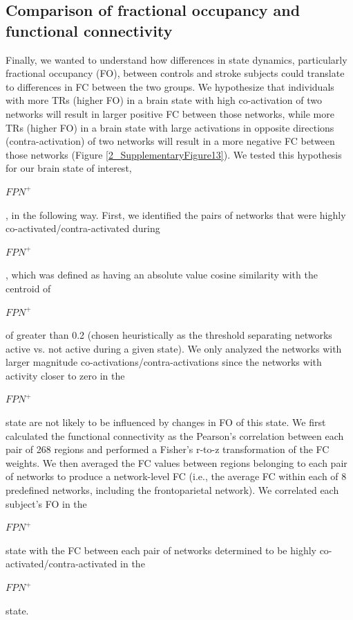 \documentclass[phd,tocprelim]{cornell}
\begin{document}
    \subsection{Comparison of fractional occupancy and functional connectivity}
    Finally, we wanted to understand how differences in state dynamics, particularly fractional occupancy (FO), between controls and stroke subjects could translate to differences in FC between the two groups. We hypothesize that individuals with more TRs (higher FO) in a brain state with high co-activation of two networks will result in larger positive FC between those networks, while more TRs (higher FO) in a brain state with large activations in opposite directions (contra-activation) of two networks will result in a more negative FC between those networks (Figure \ref{2_SupplementaryFigure13}). We tested this hypothesis for our brain state of interest,  \begin{Large}$FPN^+$\end{Large}, in the following way. First, we identified the pairs of networks that were highly co-activated/contra-activated during  \begin{Large}$FPN^+$\end{Large}, which was defined as having an absolute value cosine similarity with the centroid of  \begin{Large}$FPN^+$ \end{Large} of greater than 0.2 (chosen heuristically as the threshold separating networks active vs. not active during a given state). We only analyzed the networks with larger magnitude co-activations/contra-activations since the networks with activity closer to zero in the  \begin{Large}$FPN^+$ \end{Large} state are not likely to be influenced by changes in FO of this state. We first calculated the functional connectivity as the Pearson's correlation between each pair of 268 regions and performed a Fisher's r-to-z transformation of the FC weights. We then averaged the FC values between regions belonging to each pair of networks to produce a network-level FC (i.e., the average FC within each of 8 predefined networks, including the frontoparietal network). We correlated each subject's FO in the  \begin{Large}$FPN^+$ \end{Large} state with the FC between each pair of networks determined to be highly co-activated/contra-activated in the  \begin{Large}$FPN^+$ \end{Large} state.
\end{document}

